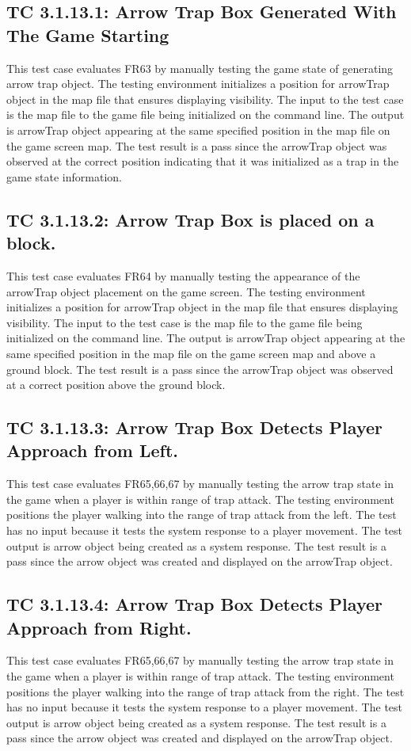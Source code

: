 \documentclass[12pt, titlepage]{article}
\begin{document}
\subsection*{TC 3.1.13.1: Arrow Trap Box Generated With The Game Starting}
This test case evaluates FR63 by manually testing the game state of generating arrow trap object. The testing environment initializes a position for arrowTrap object in the map file that ensures displaying visibility. The input to the test case is the map file to the game file being initialized on the command line. The output is arrowTrap object appearing at the same specified position in the map file on the game screen map. The test result is a pass since the arrowTrap object was observed at the correct position indicating that it was initialized as a trap in the game state information.  

\subsection*{TC 3.1.13.2: Arrow Trap Box is placed on a block.}
This test case evaluates FR64 by manually testing the appearance of the arrowTrap object placement on the game screen. The testing environment initializes a position for arrowTrap object in the map file that ensures displaying visibility. The input to the test case is the map file to the game file being initialized on the command line. The output is arrowTrap object appearing at the same specified position in the map file on the game screen map and above a ground block. The test result is a pass since the arrowTrap object was observed at a correct position above the ground block.

\subsection*{TC 3.1.13.3: Arrow Trap Box Detects Player Approach from Left.}
This test case evaluates FR65,66,67 by manually testing the arrow trap state in the game when a player is within range of trap attack. The testing environment positions the player walking into the range of trap attack from the left. The test has no input because it tests the system response to a player movement. The test output is arrow object being created as a system response. The test result is a pass since the arrow object was created and displayed on the arrowTrap object.

\subsection*{TC 3.1.13.4: Arrow Trap Box Detects Player Approach from Right.}
This test case evaluates FR65,66,67 by manually testing the arrow trap state in the game when a player is within range of trap attack. The testing environment positions the player walking into the range of trap attack from the right. The test has no input because it tests the system response to a player movement. The test output is arrow object being created as a system response. The test result is a pass since the arrow object was created and displayed on the arrowTrap object.
\end{document}
